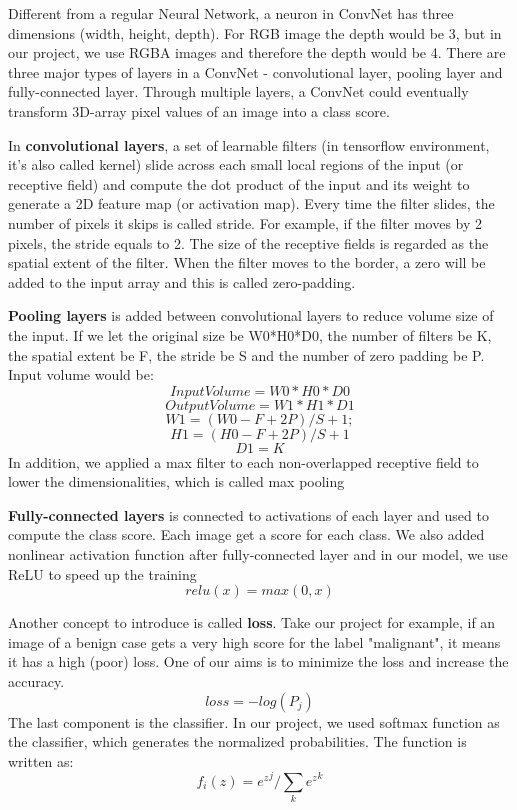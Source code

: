 \documentclass[twoside,11pt]{article}
\begin{document}
Different from a regular Neural Network, a neuron in ConvNet has three dimensions (width, height, depth). For RGB image the depth would be 3, but in our project, we use RGBA images and therefore the depth would be 4. There are three major types of layers in a ConvNet - convolutional layer, pooling layer and fully-connected layer. Through multiple layers, a ConvNet could eventually transform 3D-array pixel values of an image into a class score. 

In \textbf{convolutional layers}, a set of learnable filters (in tensorflow environment, it's also called kernel) slide across each small local regions of the input (or receptive field) and compute the dot product of the input and its weight to generate a 2D feature map (or activation map)\citep{6}. Every time the filter slides, the number of pixels it skips is called stride. For example, if the filter moves by 2 pixels, the stride equals to 2. The size of the receptive fields is regarded as the spatial extent of the filter. When the filter moves to the border, a zero will be added to the input array and this is called zero-padding. 

\textbf{Pooling layers} is added between convolutional layers to reduce volume size of the input. If we let the original size be W0*H0*D0, the number of filters be K, the spatial extent be F, the stride be S and the number of zero padding be P. 
Input volume would be:
\[
Input Volume = W0 *H0 *D0
\]
\[
Output Volume = W1 *H1 *D1
\]
\[
W1 = (W0 - F +2P)/S +1;
\]
\[
H1 = (H0 - F +2P)/S +1
\]
\[
D1 = K
\]
In addition, we applied a max filter to each non-overlapped receptive field to lower the dimensionalities, which is called max pooling

\textbf{Fully-connected layers} is connected to activations of each layer and used to compute the class score. Each image get a score for each class. We also added nonlinear activation function after fully-connected layer and in our model, we use ReLU to speed up the training
\[
relu(x) = max(0,x)
\]

Another concept to introduce is called \textbf{loss}. Take our project for example, if an image of a benign case gets a very high score for the label "malignant", it means it has a high (poor) loss. One of our aims is to minimize the loss and increase the accuracy. 
\[
loss = -log(P_j)
\]
The last component is the classifier. In our project, we used softmax function as the classifier, which generates the normalized probabilities. The function is written as: 
\[
	f_i(z) = {e^z}^j/\sum_{k}{e^z}^k
\]
\end{document}
